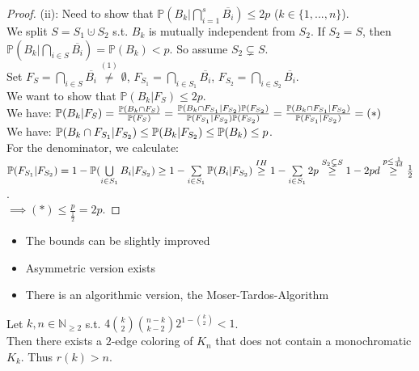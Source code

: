 \begin{proof}
    (ii): Need to show that $\mathbb{P}(B_k|\bigcap\limits_{i=1}^s \overline{B_i})\leq 2p$ ($k\in\{1,...,n\}$).\\
    We split $S=S_1\cupdot S_2$ s.t. $B_k$ is mutually independent from $S_2$. If $S_2=S$, then $\mathbb{P}(B_k|\bigcap\limits_{i\in S} \overline{B_i})=\mathbb{P}(B_k)<p$. So assume $S_2\subsetneq S$.\\
    Set $F_S=\bigcap\limits_{i\in S} \overline{B_i}\stackrel{(1)}{\neq}\emptyset$, $F_{S_1}=\bigcap\limits_{i\in S_1} \overline{B_i}$, $F_{S_2}=\bigcap\limits_{i\in S_2} \overline{B_i}$.\\
    We want to show that $\mathbb{P}(B_k|F_S)\leq 2p$.\\
    We have: $\mathbb{P}(B_k|F_S)=\frac{\mathbb{P}(B_k\cap F_S)}{\mathbb{P}(F_S)}=\frac{\mathbb{P}(B_k\cap F_{S_1}|F_{S_2})\mathbb{P}(F_{S_2})}{\mathbb{P}(F_{S_1}|F_{S_2})\mathbb{P}(F_{S_2})}=\frac{\mathbb{P}(B_k\cap F_{S_1}|F_{S_2})}{\mathbb{P}(F_{S_1}|F_{S_2})}=(\ast)$\\
    We have: $\mathbb{P}(B_k\cap F_{S_1}|F_{S_2})\leq\mathbb{P}(B_k|F_{S_2})\leq\mathbb{P}(B_k)\leq p$.\\
    For the denominator, we calculate: $\mathbb{P}(F_{S_1}|F_{S_2})=1-\mathbb{P}(\bigcup\limits_{i\in S_1} B_i|F_{S_2})\geq 1-\sum\limits_{i\in S_1} \mathbb{P}(B_i|F_{S_2})\stackrel{IH}{\geq}1-\sum\limits_{i\in S_1} 2p\stackrel{S_2\subsetneq S}{\geq}1-2pd\stackrel{p\leq\frac{1}{4d}}{\geq}\frac{1}{2}$.\\
    $\implies (\ast)\leq\frac{p}{\frac{1}{2}}=2p$.
\end{proof}
\begin{remark}\label{7.8}
    \begin{itemize}
        \item The bounds can be slightly improved
        \item Asymmetric version exists
        \item There is an algorithmic version, the Moser-Tardos-Algorithm
    \end{itemize}
\end{remark}
\begin{lemma}\label{7.9}
    Let $k,n\in\mathbb{N}_{\geq 2}$ s.t. $4\binom{k}{2}\binom{n-k}{k-2}2^{1-\binom{k}{2}}<1$.\\
    Then there exists a $2$-edge coloring of $K_n$ that does not contain a monochromatic $K_k$. Thus $r(k)>n$.
\end{lemma}
